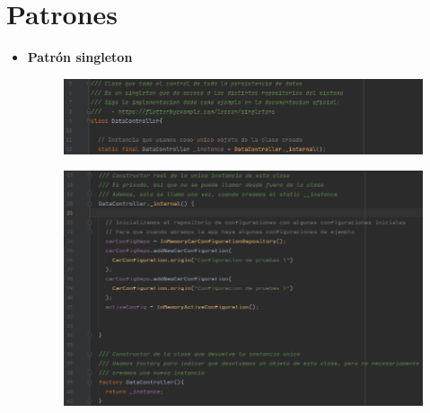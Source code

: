 \section{Patrones}


\begin{itemize}
    \item \textbf{Patrón singleton}
        \begin{figure}[H]
        \centering
        \includegraphics[scale=0.6]{imagenes/ds-singleton1.png}
        \end{figure}
        \begin{figure}[H]
        \centering
        \includegraphics[scale=0.6]{imagenes/ds-singleton2.png}
        \end{figure}
        
        \newpage
        

\end{itemize}
